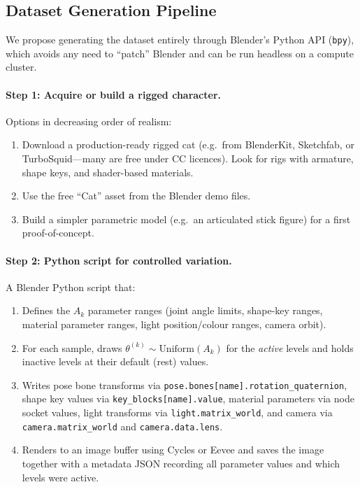 \documentclass[11pt,a4paper]{article}
\begin{document}
\subsection{Dataset Generation Pipeline}\label{sec:datagen}

We propose generating the dataset entirely through
Blender's Python API (\texttt{bpy}), which avoids
any need to ``patch'' Blender and can be run headless
on a compute cluster.

\paragraph{Step 1: Acquire or build a rigged character.}
Options in decreasing order of realism:
\begin{enumerate}[nosep]
\item Download a production-ready rigged cat
  (e.g.\ from BlenderKit, Sketchfab, or TurboSquid---many
  are free under CC licences).
  Look for rigs with armature, shape keys, and
  shader-based materials.
\item Use the free ``Cat'' asset from the Blender demo files.
\item Build a simpler parametric model (e.g.\ an articulated
  stick figure) for a first proof-of-concept.
\end{enumerate}

\paragraph{Step 2: Python script for controlled variation.}
A Blender Python script that:
\begin{enumerate}[nosep]
\item Defines the $A_k$ parameter ranges
  (joint angle limits, shape-key ranges, material parameter
  ranges, light position/colour ranges, camera orbit).
\item For each sample, draws $\theta^{(k)}\sim\text{Uniform}(A_k)$
  for the \emph{active} levels and holds inactive levels at
  their default (rest) values.
\item Writes pose bone transforms via
  \texttt{pose.bones[name].rotation\_quaternion},
  shape key values via \texttt{key\_blocks[name].value},
  material parameters via node socket values,
  light transforms via \texttt{light.matrix\_world},
  and camera via \texttt{camera.matrix\_world}
  and \texttt{camera.data.lens}.
\item Renders to an image buffer using Cycles or Eevee
  and saves the image together with a metadata JSON
  recording all parameter values and
  which levels were active.
\end{enumerate}
\end{document}
